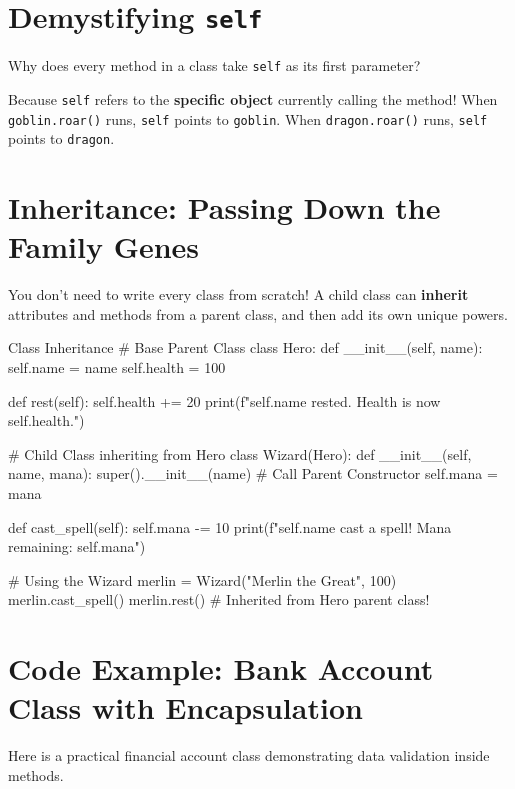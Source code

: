 \section{Demystifying \texttt{self}}

Why does every method in a class take \texttt{self} as its first parameter?

Because \texttt{self} refers to the \textbf{specific object} currently calling the method! When \texttt{goblin.roar()} runs, \texttt{self} points to \texttt{goblin}. When \texttt{dragon.roar()} runs, \texttt{self} points to \texttt{dragon}.

\section{Inheritance: Passing Down the Family Genes}

You don't need to write every class from scratch! A child class can \textbf{inherit} attributes and methods from a parent class, and then add its own unique powers.

\begin{pycode}{Class Inheritance}
# Base Parent Class
class Hero:
    def __init__(self, name):
        self.name = name
        self.health = 100

    def rest(self):
        self.health += 20
        print(f"{self.name} rested. Health is now {self.health}.")

# Child Class inheriting from Hero
class Wizard(Hero):
    def __init__(self, name, mana):
        super().__init__(name) # Call Parent Constructor
        self.mana = mana

    def cast_spell(self):
        self.mana -= 10
        print(f"{self.name} cast a spell! Mana remaining: {self.mana}")

# Using the Wizard
merlin = Wizard("Merlin the Great", 100)
merlin.cast_spell()
merlin.rest() # Inherited from Hero parent class!
\end{pycode}

\section{Code Example: Bank Account Class with Encapsulation}

Here is a practical financial account class demonstrating data validation inside methods.

